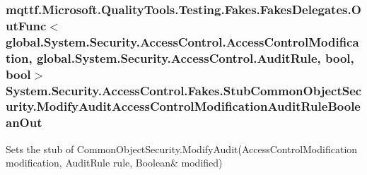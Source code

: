 \hypertarget{class_system_1_1_security_1_1_access_control_1_1_fakes_1_1_stub_common_object_security_a0010943d7702ef60abe177c4b5ba8617}{
\subsubsection[{Modify\-Audit\-Access\-Control\-Modification\-Audit\-Rule\-Boolean\-Out}]{\setlength{\rightskip}{0pt plus 5cm}mqttf.\-Microsoft.\-Quality\-Tools.\-Testing.\-Fakes.\-Fakes\-Delegates.\-Out\-Func$<$global.\-System.\-Security.\-Access\-Control.\-Access\-Control\-Modification, global.\-System.\-Security.\-Access\-Control.\-Audit\-Rule, bool, bool$>$ System.\-Security.\-Access\-Control.\-Fakes.\-Stub\-Common\-Object\-Security.\-Modify\-Audit\-Access\-Control\-Modification\-Audit\-Rule\-Boolean\-Out}}\label{class_system_1_1_security_1_1_access_control_1_1_fakes_1_1_stub_common_object_security_a0010943d7702ef60abe177c4b5ba8617}


Sets the stub of Common\-Object\-Security.\-Modify\-Audit(Access\-Control\-Modification modification, Audit\-Rule rule, Boolean\& modified)

